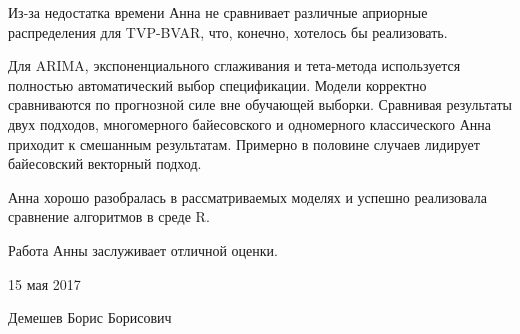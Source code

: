 \documentclass[a4paper, 12pt]{article}
\begin{document}
Из-за недостатка времени Анна не сравнивает различные априорные
распределения для TVP-BVAR, что, конечно, хотелось бы реализовать.

Для ARIMA, экспоненциального сглаживания и тета-метода используется
полностью автоматический выбор спецификации. Модели корректно
сравниваются по прогнозной силе вне обучающей выборки. Сравнивая
результаты двух подходов, многомерного байесовского и одномерного
классического Анна приходит к смешанным результатам. Примерно в половине
случаев лидирует байесовский векторный подход.

Анна хорошо разобралась в рассматриваемых моделях и успешно реализовала
сравнение алгоритмов в среде R.

Работа Анны заслуживает отличной оценки.

\vspace{1cm}

15 мая 2017

Демешев Борис Борисович
\end{document}
